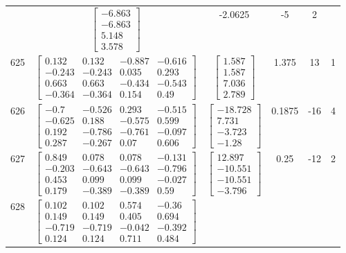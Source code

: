 \documentclass[a4paper,12pt]{article}
\begin{document}
\begin{tabular}{c c c c c c}
&
$\begin{bmatrix} -6.863 \\ -6.863 \\ 5.148 \\ 3.578 \end{bmatrix}$
&
-2.0625
&
-5
&
2
\\
625
&
$\begin{bmatrix} 0.132 & 0.132 & -0.887 & -0.616 \\ -0.243 & -0.243 & 0.035 & 0.293 \\ 0.663 & 0.663 & -0.434 & -0.543 \\ -0.364 & -0.364 & 0.154 & 0.49 \end{bmatrix}$
&
$\begin{bmatrix} 1.587 \\ 1.587 \\ 7.036 \\ 2.789 \end{bmatrix}$
&
1.375
&
13
&
1
\\
626
&
$\begin{bmatrix} -0.7 & -0.526 & 0.293 & -0.515 \\ -0.625 & 0.188 & -0.575 & 0.599 \\ 0.192 & -0.786 & -0.761 & -0.097 \\ 0.287 & -0.267 & 0.07 & 0.606 \end{bmatrix}$
&
$\begin{bmatrix} -18.728 \\ 7.731 \\ -3.723 \\ -1.28 \end{bmatrix}$
&
0.1875
&
-16
&
4
\\
627
&
$\begin{bmatrix} 0.849 & 0.078 & 0.078 & -0.131 \\ -0.203 & -0.643 & -0.643 & -0.796 \\ 0.453 & 0.099 & 0.099 & -0.027 \\ 0.179 & -0.389 & -0.389 & 0.59 \end{bmatrix}$
&
$\begin{bmatrix} 12.897 \\ -10.551 \\ -10.551 \\ -3.796 \end{bmatrix}$
&
0.25
&
-12
&
2
\\
628
&
$\begin{bmatrix} 0.102 & 0.102 & 0.574 & -0.36 \\ 0.149 & 0.149 & 0.405 & 0.694 \\ -0.719 & -0.719 & -0.042 & -0.392 \\ 0.124 & 0.124 & 0.711 & 0.484 \end{bmatrix}$

\end{tabular}
\end{document}
